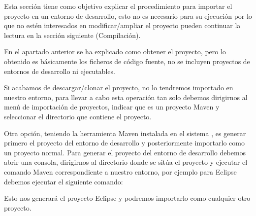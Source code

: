 Esta sección tiene como objetivo explicar el procedimiento para importar el proyecto en un entorno de desarrollo, esto no es necesario para su ejecución por lo que no estén interesados en modificar/ampliar el proyecto pueden continuar la lectura en la sección siguiente (Compilación).

En el apartado anterior se ha explicado como obtener el proyecto, pero lo obtenido es básicamente los ficheros de código fuente, no se incluyen proyectos de entornos de desarrollo ni ejecutables.

Si acabamos de descargar/clonar el proyecto, no lo tendremos importado en nuestro entorno, para llevar a cabo esta operación tan solo debemos dirigirnos al men\'u de importación de proyectos, indicar que es un proyecto Maven y seleccionar el directorio que contiene el proyecto. 

Otra opción, teniendo la herramienta Maven instalada en el sistema \cite{instalacion_maven}, es generar primero el proyecto del entorno de desarrollo y posteriormente importarlo como un proyecto normal. Para generar el proyecto del entorno de desarrollo debemos abrir una consola, dirigirnos al directorio donde se sitúa el proyecto y ejecutar el comando Maven correspondiente a nuestro entorno, por ejemplo para Eclipse debemos ejecutar el siguiente comando:


Esto nos generar\'a el proyecto Eclipse y podremos importarlo como cualquier otro proyecto.
